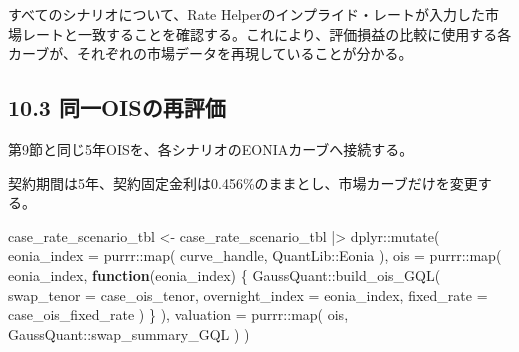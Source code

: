 \documentclass[
  letterpaper,
  DIV=11,
  numbers=noendperiod]{scrreprt}
\newenvironment{Shaded}{\begin{snugshade}}{\end{snugshade}}
\newcommand{\AttributeTok}[1]{\textcolor[rgb]{0.40,0.45,0.13}{#1}}
\newcommand{\ControlFlowTok}[1]{\textcolor[rgb]{0.00,0.23,0.31}{\textbf{#1}}}
\newcommand{\FloatTok}[1]{\textcolor[rgb]{0.68,0.00,0.00}{#1}}
\newcommand{\FunctionTok}[1]{\textcolor[rgb]{0.28,0.35,0.67}{#1}}
\newcommand{\NormalTok}[1]{\textcolor[rgb]{0.00,0.23,0.31}{#1}}
\newcommand{\OtherTok}[1]{\textcolor[rgb]{0.00,0.23,0.31}{#1}}
\newcommand{\SpecialCharTok}[1]{\textcolor[rgb]{0.37,0.37,0.37}{#1}}
\begin{document}
\begin{Shaded}
\end{Shaded}

すべてのシナリオについて、Rate
Helperのインプライド・レートが入力した市場レートと一致することを確認する。これにより、評価損益の比較に使用する各カーブが、それぞれの市場データを再現していることが分かる。

\subsection{10.3
同一OISの再評価}\label{ux540cux4e00oisux306eux518dux8a55ux4fa1}

第9節と同じ5年OISを、各シナリオのEONIAカーブへ接続する。

契約期間は5年、契約固定金利は0.456\%のままとし、市場カーブだけを変更する。

\begin{Shaded}
\begin{Highlighting}[]
\NormalTok{case\_rate\_scenario\_tbl }\OtherTok{\textless{}{-}}\NormalTok{ case\_rate\_scenario\_tbl }\SpecialCharTok{|\textgreater{}}
\NormalTok{  dplyr}\SpecialCharTok{::}\FunctionTok{mutate}\NormalTok{(}
    \AttributeTok{eonia\_index =}\NormalTok{ purrr}\SpecialCharTok{::}\FunctionTok{map}\NormalTok{(}
\NormalTok{      curve\_handle,}
\NormalTok{      QuantLib}\SpecialCharTok{::}\NormalTok{Eonia}
\NormalTok{    ),}
    \AttributeTok{ois =}\NormalTok{ purrr}\SpecialCharTok{::}\FunctionTok{map}\NormalTok{(}
\NormalTok{      eonia\_index,}
      \ControlFlowTok{function}\NormalTok{(eonia\_index) \{}
\NormalTok{        GaussQuant}\SpecialCharTok{::}\FunctionTok{build\_ois\_GQL}\NormalTok{(}
          \AttributeTok{swap\_tenor =}\NormalTok{ case\_ois\_tenor,}
          \AttributeTok{overnight\_index =}\NormalTok{ eonia\_index,}
          \AttributeTok{fixed\_rate =}\NormalTok{ case\_ois\_fixed\_rate}
\NormalTok{        )}
\NormalTok{      \}}
\NormalTok{    ),}
    \AttributeTok{valuation =}\NormalTok{ purrr}\SpecialCharTok{::}\FunctionTok{map}\NormalTok{(}
\NormalTok{      ois,}
\NormalTok{      GaussQuant}\SpecialCharTok{::}\NormalTok{swap\_summary\_GQL}
\NormalTok{    )}
\NormalTok{  )}
\end{Highlighting}
\end{Shaded}
\end{document}
